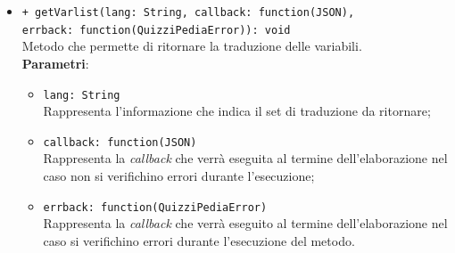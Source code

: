 \begin{itemize}
			\begin{itemize}
				\item \texttt{+ getVarlist(lang: String, callback: function(JSON), \\ errback: function(QuizziPediaError)): void} \\
				Metodo che permette di ritornare la traduzione delle variabili. \\
				\textbf{Parametri}:
					\begin{itemize}
						\item \texttt{lang: String} \\
						Rappresenta l'informazione che indica il set di traduzione da ritornare;
						\item \texttt{callback: function(JSON)} \\
						Rappresenta la \textit{callback} che verrà eseguita al termine dell'elaborazione nel caso non si verifichino errori durante l'esecuzione;
						\item \texttt{errback: function(QuizziPediaError)} \\
						Rappresenta la \textit{callback} che verrà eseguito al termine dell'elaborazione nel caso si verifichino errori durante l'esecuzione del metodo.
					\end{itemize}
			\end{itemize}
	\end{itemize}
	